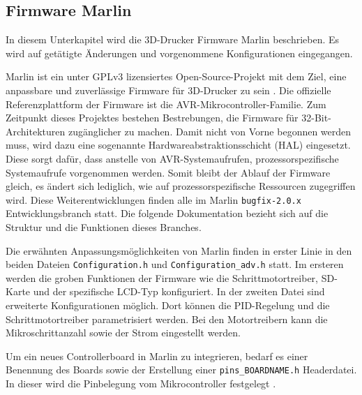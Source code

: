 \subsection{Firmware Marlin}
\label{sec:FirmwareMarlin}

In diesem Unterkapitel wird die 3D-Drucker Firmware Marlin beschrieben. Es wird auf getätigte Änderungen und vorgenommene Konfigurationen eingegangen.

Marlin ist ein unter GPLv3 lizensiertes Open-Source-Projekt mit dem Ziel, eine anpassbare und zuverlässige Firmware für 3D-Drucker zu sein \cite{GnuGPLv3}. Die offizielle Referenzplattform der Firmware ist die AVR-Mikrocontroller-Familie.
Zum Zeitpunkt dieses Projektes bestehen Bestrebungen, die Firmware für 32-Bit-Architekturen zugänglicher zu machen. Damit nicht von Vorne begonnen werden muss, wird dazu eine sogenannte Hardwareabstraktionsschicht (HAL) eingesetzt. Diese sorgt dafür, dass anstelle von AVR-Systemaufrufen, prozessorspezifische Systemaufrufe vorgenommen werden. Somit bleibt der Ablauf der Firmware gleich, es ändert sich lediglich, wie auf prozessorspezifische Ressourcen zugegriffen wird. Diese Weiterentwicklungen finden alle im Marlin \texttt{bugfix-2.0.x} Entwicklungsbranch statt. Die folgende Dokumentation bezieht sich auf die Struktur und die Funktionen dieses Branches.

Die erwähnten Anpassungsmöglichkeiten von Marlin finden in erster Linie in den beiden Dateien \texttt{Configuration.h} und \texttt{Configuration\_adv.h} statt. Im ersteren werden die groben Funktionen der Firmware wie die Schrittmotortreiber, SD-Karte und der spezifische LCD-Typ konfiguriert. In der zweiten Datei sind erweiterte Konfigurationen möglich.
Dort können die PID-Regelung und die Schrittmotortreiber parametrisiert werden. Bei den Motortreibern kann die Mikroschrittanzahl sowie der Strom eingestellt werden.

Um ein neues Controllerboard in Marlin zu integrieren, bedarf es einer Benennung des Boards sowie der Erstellung einer \texttt{pins\_BOARDNAME.h} Headerdatei. In dieser wird die Pinbelegung vom Mikrocontroller festgelegt \cite{MarlinBoards}.
